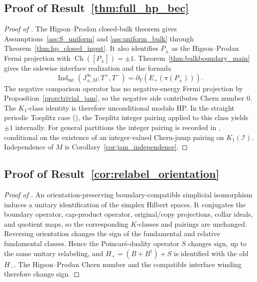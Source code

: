 \documentclass[11pt]{article}
\numberwithin{equation}{section}
\theoremstyle{definition}
\theoremstyle{remark}
\newcommand{\Indint}{\operatorname{Ind}_{\mathrm{int}}}
\newcommand{\Ch}{\operatorname{Ch}}
\begin{document}
\subsection{Proof of Result~\ref{thm:full_hp_bec}}\label{app:proof:thm:full_hp_bec}
\begin{proof}[Proof of ]
The Higson--Prodan closed-bulk theorem gives Assumptions~\ref{ass:S_uniform} and
\ref{ass:uniform_bulk} through Theorem~\ref{thm:hp_closed_input}. It also identifies \(P_\pm\) as
the Higson--Prodan Fermi projection with \(\Ch([P_\pm])=\pm1\). Theorem~\ref{thm:bulkboundary_main}
gives the sidewise interface realization and the formula
\[
\Indint(J_{\pm,M}^\infty;T^+,T^-)
=
\partial_Y(E_+(\pi(P_\pm))).
\]
The negative comparison operator has no negative-energy Fermi projection by
Proposition~\ref{prop:trivial_jam}, so the negative side contributes Chern number \(0\). The
\(K_1\)-class identity is therefore unconditional modulo HP. In the straight periodic
Toeplitz case (), the Toeplitz integer pairing applied to this
class yields \(\pm1\) internally. For general partitions the integer pairing is recorded in
, conditional on the existence of an integer-valued
Chern-jump pairing on \(K_1(\mathcal I)\). Independence of \(M\)
is Corollary~\ref{cor:jam_independence}.
\end{proof}

\subsection{Proof of Result~\ref{cor:relabel_orientation}}\label{app:proof:cor:relabel_orientation}
\begin{proof}[Proof of ]
An orientation-preserving boundary-compatible simplicial isomorphism induces a unitary
identification of the simplex Hilbert spaces. It conjugates the boundary operator, cap-product
operator, original/copy projections, collar ideals, and quotient maps, so the corresponding
\(K\)-classes and pairings are unchanged. Reversing orientation changes the sign of the fundamental
and relative fundamental classes. Hence the Poincar\'e-duality operator \(S\) changes sign, up to
the same unitary relabeling, and \(H_+=(B+B^\dagger)+S\) is identified with the old \(H_-\). The
Higson--Prodan Chern number and the compatible interface winding therefore change sign.
\end{proof}
\end{document}
